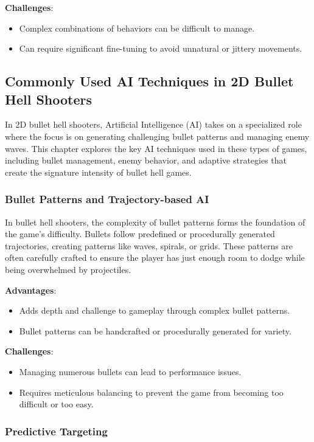 \textbf{Challenges}:
\begin{itemize}
    \item Complex combinations of behaviors can be difficult to manage.
    \item Can require significant fine-tuning to avoid unnatural or jittery movements.
\end{itemize}

\subsection{Commonly Used AI Techniques in 2D Bullet Hell Shooters}

In 2D bullet hell shooters, Artificial Intelligence (AI) takes on a specialized role where the focus is on generating challenging bullet patterns and managing enemy waves. This chapter explores the key AI techniques used in these types of games, including bullet management, enemy behavior, and adaptive strategies that create the signature intensity of bullet hell games.

\subsubsection{Bullet Patterns and Trajectory-based AI}

In bullet hell shooters, the complexity of bullet patterns forms the foundation of the game's difficulty. Bullets follow predefined or procedurally generated trajectories, creating patterns like waves, spirals, or grids. These patterns are often carefully crafted to ensure the player has just enough room to dodge while being overwhelmed by projectiles.

\textbf{Advantages}:
\begin{itemize}
    \item Adds depth and challenge to gameplay through complex bullet patterns.
    \item Bullet patterns can be handcrafted or procedurally generated for variety.
\end{itemize}

\textbf{Challenges}:
\begin{itemize}
    \item Managing numerous bullets can lead to performance issues.
    \item Requires meticulous balancing to prevent the game from becoming too difficult or too easy.
\end{itemize}

\subsubsection{Predictive Targeting}


